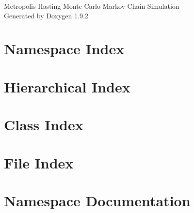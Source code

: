 \documentclass[twoside]{book}
\newcommand{\+}{\discretionary{\mbox{\scriptsize$\hookleftarrow$}}{}{}}
\newcommand{\clearemptydoublepage}{%
    \newpage{\pagestyle{empty}\cleardoublepage}%
  }
\begin{document}
  \raggedbottom
    \hypersetup{pageanchor=false,
                bookmarksnumbered=true,
                pdfencoding=unicode
               }
  \begin{titlepage}
  \vspace*{7cm}
  \begin{center}%
  {\Large Metropolis Hasting Monte-\/\+Carlo Markov Chain Simulation}\\
  \vspace*{1cm}
  {\large Generated by Doxygen 1.9.2}\\
  \end{center}
  \end{titlepage}
  \clearemptydoublepage
  \tableofcontents
  \clearemptydoublepage
  \hypersetup{pageanchor=true}
\chapter{Namespace Index}

\chapter{Hierarchical Index}

\chapter{Class Index}

\chapter{File Index}

\chapter{Namespace Documentation}

\end{document}
